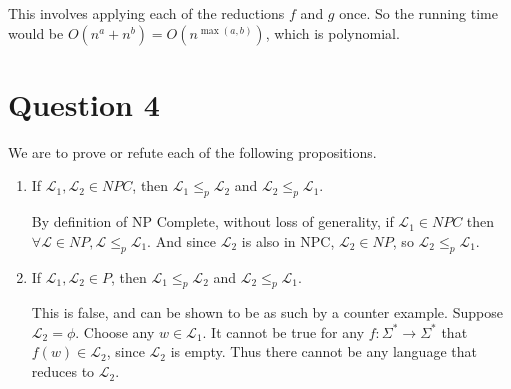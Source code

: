 \documentclass{article}
\newcommand{\lang}{\mathcal{L}}
\begin{document}
This involves applying each of the reductions \(f\) and \(g\) once. So the running time would be \(O(n^a + n^b) = O(n^{\max(a, b)})\), which is polynomial.

\section*{Question 4}

We are to prove or refute each of the following propositions.

\begin{enumerate}[label=\alph*.]
	\item
		If \(\lang_1, \lang_2 \in \mathit{NPC}\), then \(\lang_1 \leq_p \lang_2\) and \(\lang_2 \leq_p \lang_1\).

		By definition of NP Complete, without loss of generality, if \(\lang_1 \in \mathit{NPC}\) then \(\forall \lang \in \mathit{NP}, \lang \leq_p \lang_1\). And since \(\lang_2\) is also in NPC, \(\lang_2 \in NP\), so \(\lang_2 \leq_p \lang_1\).

	\item
		If \(\lang_1, \lang_2 \in P\), then \(\lang_1 \leq_p \lang_2\) and \(\lang_2 \leq_p \lang_1\).

		This is false, and can be shown to be as such by a counter example. Suppose \(\lang_2 = \phi\). Choose any \(w \in \lang_1\). It cannot be true for any \(f: \Sigma^* \to \Sigma^*\) that \(f(w) \in \lang_2\), since \(\lang_2\) is empty. Thus there cannot be any language that reduces to \(\lang_2\).
\end{enumerate}
\end{document}
